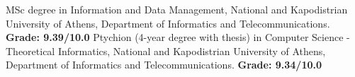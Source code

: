 	\begin{scholarship}
						{MSc degree in Information and Data Management, National and Kapodistrian University of Athens, Department of Informatics and Telecommunications. \textbf{Grade: 9.39/10.0}}
						{Ptychion (4-year degree with thesis) in Computer Science - Theoretical Informatics, National and Kapodistrian University of Athens, Department of Informatics and Telecommunications. \textbf{Grade: 9.34/10.0}}
	\end{scholarship}
